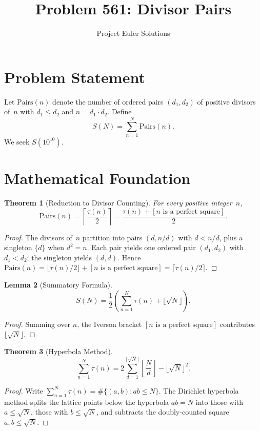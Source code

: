 \documentclass[11pt]{article}
\title{Problem 561: Divisor Pairs}
\author{Project Euler Solutions}
\date{}
\newtheorem{theorem}{Theorem}
\newtheorem{lemma}[theorem]{Lemma}
\begin{document}
\maketitle

\section{Problem Statement}

Let $\mathrm{Pairs}(n)$ denote the number of ordered pairs $(d_1,d_2)$ of positive divisors of~$n$ with $d_1 \le d_2$ and $n = d_1 \cdot d_2$. Define
\[
S(N) = \sum_{n=1}^{N}\mathrm{Pairs}(n).
\]
We seek $S(10^{10})$.

\section{Mathematical Foundation}

\begin{theorem}[Reduction to Divisor Counting]
For every positive integer~$n$,
\[
\mathrm{Pairs}(n) = \left\lceil \frac{\tau(n)}{2}\right\rceil = \frac{\tau(n) + [n \text{ is a perfect square}]}{2}.
\]
\end{theorem}

\begin{proof}
The divisors of~$n$ partition into pairs $(d, n/d)$ with $d < n/d$, plus a singleton $\{d\}$ when $d^2 = n$. Each pair yields one ordered pair $(d_1,d_2)$ with $d_1 < d_2$; the singleton yields $(d,d)$. Hence
$\mathrm{Pairs}(n) = \lfloor\tau(n)/2\rfloor + [n \text{ is a perfect square}] = \lceil\tau(n)/2\rceil$.
\end{proof}

\begin{lemma}[Summatory Formula]
\[
S(N) = \frac{1}{2}\!\left(\sum_{n=1}^{N}\tau(n) + \lfloor\sqrt{N}\rfloor\right).
\]
\end{lemma}

\begin{proof}
Summing over $n$, the Iverson bracket $[n\text{ is a perfect square}]$ contributes $\lfloor\sqrt{N}\rfloor$.
\end{proof}

\begin{theorem}[Hyperbola Method]
\[
\sum_{n=1}^{N}\tau(n) = 2\sum_{d=1}^{\lfloor\sqrt{N}\rfloor}\left\lfloor\frac{N}{d}\right\rfloor - \lfloor\sqrt{N}\rfloor^2.
\]
\end{theorem}

\begin{proof}
Write $\sum_{n=1}^{N}\tau(n) = \#\{(a,b): ab \le N\}$. The Dirichlet hyperbola method splits the lattice points below the hyperbola $ab = N$ into those with $a \le \sqrt{N}$, those with $b \le \sqrt{N}$, and subtracts the doubly-counted square $a,b \le \sqrt{N}$.
\end{proof}
\end{document}

